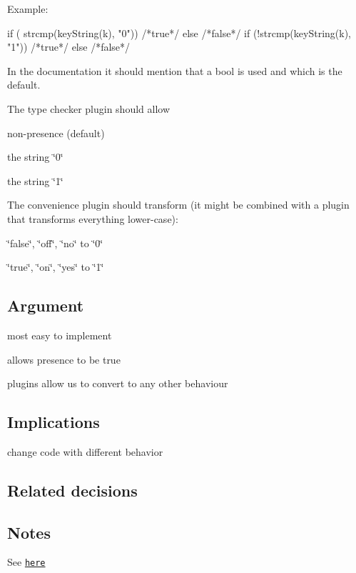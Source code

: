 Example\+: \begin{DoxyVerb}if ( strcmp(keyString(k), "0")) {/*true*/} else {/*false*/}
if (!strcmp(keyString(k), "1")) {/*true*/} else {/*false*/}
\end{DoxyVerb}


In the documentation it should mention that a bool is used and which is the default.

The type checker plugin should allow


\begin{DoxyItemize}
\item non-\/presence (default)
\item the string \char`\"{}0\char`\"{}
\item the string \char`\"{}1\char`\"{}
\end{DoxyItemize}

The convenience plugin should transform (it might be combined with a plugin that transforms everything lower-\/case)\+:


\begin{DoxyItemize}
\item \char`\"{}false\char`\"{}, \char`\"{}off\char`\"{}, \char`\"{}no\char`\"{} to \char`\"{}0\char`\"{}
\item \char`\"{}true\char`\"{}, \char`\"{}on\char`\"{}, \char`\"{}yes\char`\"{} to \char`\"{}1\char`\"{}
\end{DoxyItemize}

\subsection*{Argument}


\begin{DoxyItemize}
\item most easy to implement
\item allows presence to be true
\item plugins allow us to convert to any other behaviour
\end{DoxyItemize}

\subsection*{Implications}


\begin{DoxyItemize}
\item change code with different behavior
\end{DoxyItemize}

\subsection*{Related decisions}

\subsection*{Notes}

See \href{https://github.com/ElektraInitiative/libelektra/issues/308}{\tt here} 